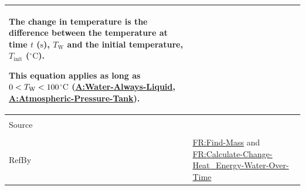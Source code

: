 \documentclass[12pt]{article}
\newcommand{\lt}{\ensuremath <}
\begin{document}
\begin{minipage}{\textwidth}
\begin{tabular}{>{\raggedright}p{}>{\raggedright\arraybackslash}p{}}
        The change in temperature is the difference between the temperature at time $t$ (${\text{s}}$), ${T_{\text{W}}}$ and the initial temperature, ${T_{\text{init}}}$ (${{}^{\circ}\text{C}}$).
        
        This equation applies as long as $0\lt{}{T_{\text{W}}}\lt{}100$${{}^{\circ}\text{C}}$ (\hyperref[assumpWAL]{A:Water-Always-Liquid}, \hyperref[assumpAPT]{A:Atmospheric-Pressure-Tank}).
        
\\ \midrule \\
Source & \cite{koothoor2013}
         
\\ \midrule \\
RefBy & \hyperref[findMass]{FR:Find-Mass} and \hyperref[calcChgHeatEnergyWtrOverTime]{FR:Calculate-Change-Heat\_Energy-Water-Over-Time}
        
\\ \bottomrule
\end{tabular}
\end{minipage}
\end{document}
